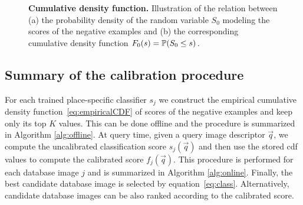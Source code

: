       \begin{figure}[t]
         \vspace*{-3mm}
         \caption{
         \textbf{Cumulative density function.}
         Illustration of the relation between (a) the probability density of the random variable $S_0$ modeling the scores of the negative examples and (b) the corresponding cumulative density function $F_0(s)=\mathbb{P}(S_0 \leq s)$.
         }
               \vspace*{-3mm}
         \label{fig:qntExample}
      \end{figure}
      
      
   \subsection{Summary of the calibration procedure}
    
    For each trained place-specific classifier $s_j$ we construct the empirical cumulative density function~\eqref{eq:empiricalCDF} of scores of the negative examples and keep only its top $K$ values. This can be done offline and the procedure is summarized in Algorithm \ref{alg:offline}. 
    At query time, given a query image descriptor $\vec{q}$, we compute the uncalibrated classification score $s_j(\vec{q})$ and then use the stored cdf values to compute the calibrated score $f_j(\vec{q})$. This procedure is performed for each database image $j$ and is summarized in Algorithm \ref{alg:online}.
    Finally, the best candidate database image is selected by equation~\eqref{eq:class}. Alternatively, candidate database images can be also ranked according to the calibrated score.
 
